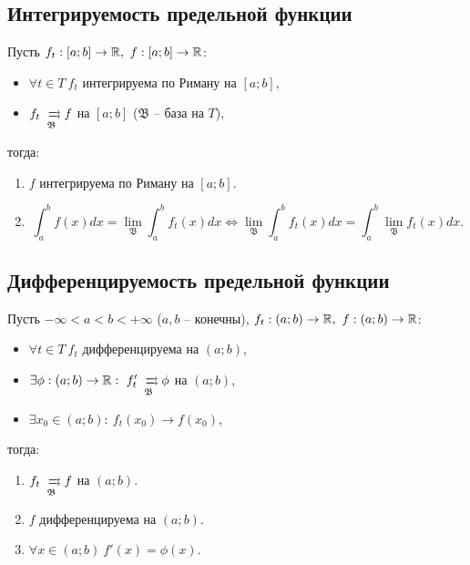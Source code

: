 \subsection{Интегрируемость предельной функции}

\begin{theorem}\label{theorem:6.9.2}
    Пусть $ f_t: [a;b] \rightarrow \mathbb{R}, \ f: [a;b] \rightarrow \mathbb{R} $:
    \begin{itemize}
        \item $ \forall t \in T \ f_t $ интегрируема по Риману на $ [a;b] $,
        \item $ f_t \xrightrightarrows[\mathfrak{B}]{} f $ на $ [a;b] $ ($ \mathfrak{B} $ -- база на $ T $),
    \end{itemize}
    тогда:
    \begin{enumerate}
        \item $ f $ интегрируема по Риману на $ [a;b] $.
        \item \[
                  \int_{a}^{b}f(x)dx = \underset{\mathfrak{B}}{\lim}\int_{a}^{b}f_t(x)dx \iff \underset{\mathfrak{B}}{\lim}\int_{a}^{b}f_t(x)dx = \int_{a}^{b}\underset{\mathfrak{B}}{\lim}f_t(x)dx.
              \]
    \end{enumerate}
\end{theorem}

\subsection{Дифференцируемость предельной функции}

\begin{theorem}\label{theorem:6.9.5}
    Пусть $ -\infty < a < b < +\infty $ ($ a,b $ -- конечны), $ f_t: (a;b)\rightarrow\R, \ f:(a;b) \rightarrow \R $:
    \begin{itemize}
        \item $ \forall t \in T \ f_t $ дифференцируема на $ (a;b) $,
        \item $ \exists \phi: (a;b)\rightarrow\R: \ f_t' \xrightrightarrows[\mathfrak{B}]{} \phi $ на $ (a;b) $,
        \item $ \exists x_0 \in (a;b): \ f_t(x_0) \rightarrow f(x_0) $,
    \end{itemize}
    тогда:
    \begin{enumerate}
        \item $ f_t \xrightrightarrows[\mathfrak{B}]{} f $ на $ (a;b) $.
        \item $ f $ дифференцируема на $ (a;b) $.
        \item $ \forall x \in (a;b) \ f'(x) = \phi(x) $.
    \end{enumerate}
\end{theorem}
